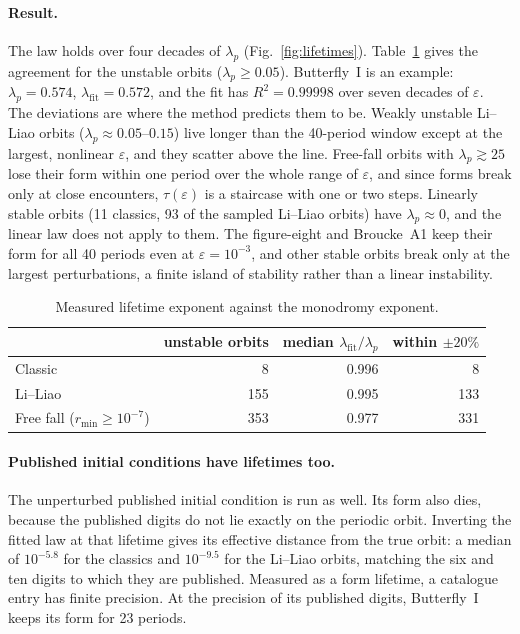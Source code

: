 \documentclass[11pt]{article}
\theoremstyle{remark}
\begin{document}
\paragraph{Result.} The law holds over four decades of $\lambda_p$ (Fig.~\ref{fig:lifetimes}).
Table~\ref{tab:lifetimes} gives the agreement for the unstable orbits ($\lambda_p\ge0.05$). Butterfly~I is an
example: $\lambda_p=0.574$, $\lambda_{\text{fit}}=0.572$, and the fit has $R^2=0.99998$ over seven decades of
$\varepsilon$. The deviations are where the method predicts them to be. Weakly unstable Li--Liao orbits
($\lambda_p\approx0.05$--$0.15$) live longer than the 40-period window except at the largest, nonlinear
$\varepsilon$, and they scatter above the line. Free-fall orbits with $\lambda_p\gtrsim25$ lose their form
within one period over the whole range of $\varepsilon$, and since forms break only at close encounters,
$\tau(\varepsilon)$ is a staircase with one or two steps. Linearly stable orbits (11 classics, 93 of the
sampled Li--Liao orbits) have $\lambda_p\approx0$, and the linear law does not apply to them. The figure-eight
and Broucke~A1 keep their form for all 40 periods even at $\varepsilon=10^{-3}$, and other stable orbits break
only at the largest perturbations, a finite island of stability rather than a linear instability.

\begin{table}[h]
\centering
\begin{tabular}{@{}lrrr@{}}
\toprule
 & unstable orbits & median $\lambda_{\text{fit}}/\lambda_p$ & within $\pm20\%$\\
\midrule
Classic & 8 & 0.996 & 8\\
Li--Liao & 155 & 0.995 & 133\\
Free fall ($r_{\min}\ge10^{-7}$) & 353 & 0.977 & 331\\
\bottomrule
\end{tabular}
\caption{Measured lifetime exponent against the monodromy exponent.}
\label{tab:lifetimes}
\end{table}

\paragraph{Published initial conditions have lifetimes too.} The unperturbed published initial condition is run
as well. Its form also dies, because the published digits do not lie exactly on the periodic orbit. Inverting the
fitted law at that lifetime gives its effective distance from the true orbit: a median of $10^{-5.8}$ for the
classics and $10^{-9.5}$ for the Li--Liao orbits, matching the six and ten digits to which they are published.
Measured as a form lifetime, a catalogue entry has finite precision. At the precision of its published digits,
Butterfly~I keeps its form for 23 periods.
\end{document}
